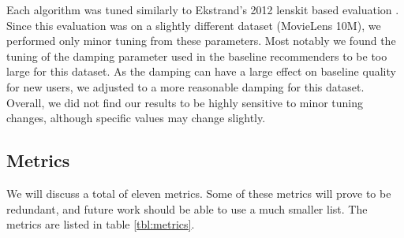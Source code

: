 \documentclass[letterpaper]{sig-alternate}
\begin{document}
  Each algorithm was tuned similarly to Ekstrand's 2012 lenskit based evaluation \cite{ekstrand2012recommenders}.
  Since this evaluation was on a slightly different dataset (MovieLens 10M), we performed only minor tuning from these parameters.
  Most notably we found the tuning of the damping parameter used in the baseline recommenders to be too large for this dataset.
  As the damping can have a large effect on baseline quality for new users, we adjusted to a more reasonable damping for this dataset.
  Overall, we did not find our results to be highly sensitive to minor tuning changes, although specific values may change slightly.

  \subsection*{Metrics}
  We will discuss a total of eleven metrics.
  Some of these metrics will prove to be redundant, and future work should be able to use a much smaller list.
  The metrics are listed in table \ref{tbl:metrics}.
\end{document}
